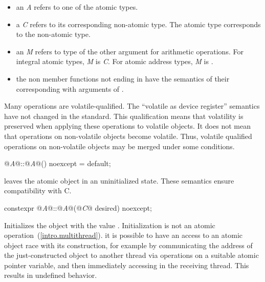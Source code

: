 \begin{itemize}
\item  an \textit{A} refers to one of the atomic types.
\item a \textit{C} refers to its corresponding non-atomic type. The
 atomic type corresponds to the  non-atomic type.
\item an \textit{M} refers to type of the other argument for arithmetic operations. For
integral atomic types, \textit{M} is \textit{C}. For atomic address types, \textit{M} is
.
\item the non member functions not ending in  have the semantics of their
corresponding  with  arguments of
.
\end{itemize}

\pnum
\enternote Many operations are volatile-qualified. The ``volatile as device register''
semantics have not changed in the standard. This qualification means that volatility is
preserved when applying these operations to volatile objects. It does not mean that
operations on non-volatile objects become volatile. Thus, volatile qualified operations
on non-volatile objects may be merged under some conditions. \exitnote

%
\begin{itemdecl}
@\textit{A}@::@\textit{A}@() noexcept = default;
\end{itemdecl}

\begin{itemdescr}
\pnum
\effects
leaves the atomic object in an uninitialized state.
\enternote
These semantics ensure compatibility with C.
\exitnote
\end{itemdescr}

%
\begin{itemdecl}
constexpr @\textit{A}@::@\textit{A}@(@\textit{C}@ desired) noexcept;
\end{itemdecl}

\begin{itemdescr}
\pnum
\effects Initializes the object with the value .
Initialization is not an atomic operation~(\ref{intro.multithread}).
\enternote it is possible to have an access to an atomic object 
race with its construction, for example by communicating the address of the
just-constructed object  to another thread via
 operations on a suitable atomic pointer
variable, and then immediately accessing  in the receiving thread.
This results in undefined behavior. \exitnote
\end{itemdescr}

